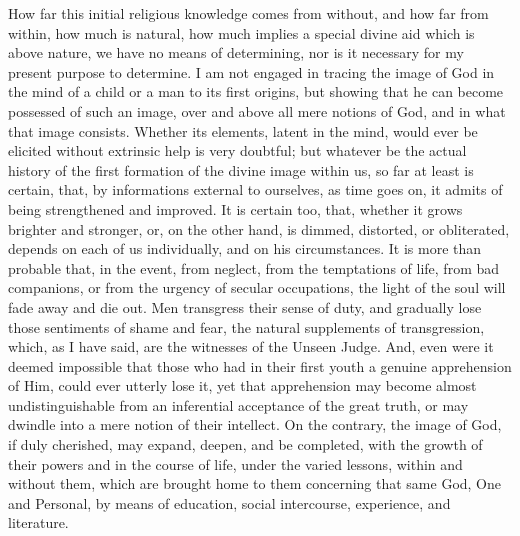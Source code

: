 How far this initial religious knowledge comes from without, and
how far from within, how much is natural, how much implies a special
divine aid which is above nature, we have no means of determining, nor
is it necessary for my present purpose to determine. I am not engaged
in tracing the image of God in the mind of a child or a man to its
first origins, but showing that he can become possessed of such an
image, over and above all mere notions of God, and in what that image
consists. Whether its elements, latent in the mind, would ever be
elicited without extrinsic help is very doubtful; but whatever be the
actual history of the first formation of the divine image within us,
so far at least is certain, that, by informations external to
ourselves, as time goes on, it admits of being strengthened and
improved. It is certain too, that, whether it grows brighter and
stronger, or, on the other hand, is dimmed, distorted, or
obliterated, depends on each of us individually, and on his
circumstances. It is more than probable that, in the event, from
neglect, from the temptations of life, from bad companions, or from
the urgency of secular occupations, the light of the soul will fade
away and die out. Men transgress their sense of duty, and gradually
lose those sentiments of shame and fear, the natural supplements of
transgression, which, as I have said, are the witnesses of the Unseen
Judge. And, even were it deemed impossible that those who had in their
first youth a genuine apprehension of Him, could ever utterly lose it,
yet that apprehension may become almost undistinguishable from an
inferential acceptance of the great truth, or may dwindle into a mere
notion of their intellect. On the contrary, the image of God, if duly
cherished, may expand, deepen, and be completed, with the growth of
their powers and in the course of life, under the varied lessons,
within and without them, which are brought home to them concerning
that same God, One and Personal, by means of education, social
intercourse, experience, and literature.

